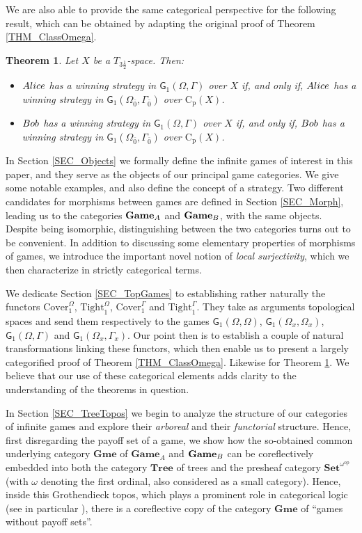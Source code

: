 \documentclass[12pt]{amsart}
\newtheorem{thm}{Theorem}[section]
\theoremstyle{definition}
\newcommand{\W}{{\Omega}}
\newcommand{\g}{\mathsf{G}}
\newcommand{\ali}{\textup{\textmd{\textsc{Alice}}}}
\newcommand{\bob}{\textup{\textmd{\textsc{Bob}}}}
\newcommand{\A}{\textup{\textmd{\textsc{A}}}}
\newcommand{\B}{\textup{\textmd{\textsc{B}}}}
\newcommand{\Cp}{\mathrm{C}_{\mathrm {p}}}
\newcommand{\Sets}{\mathbf{Set}}
\newcommand{\Tree}{\mathbf{Tree}}
\newcommand{\Games}{\mathbf{Game}}
\newcommand{\Gmes}{\mathbf{Gme}}
\newcommand{\SetNop}{\Sets^{\omega^{\op}}}
\newcommand{\op}{\mathrm{op}}
\newcommand{\Tight}{\mathrm{Tight}}
\newcommand{\Cover}{\mathrm{Cover}}
\begin{document}
We are also able to provide the same categorical perspective for the following result, which can be obtained by adapting the original proof of Theorem \ref{THM_ClassOmega}. 
\begin{thm}\label{THM_ClassGamma}	Let $X$ be a $T_{3\frac{1}{2}}$-space. Then:
	\begin{itemize}
		\item $\ali$ has a winning strategy in $\g_1(\W,\Gamma)$ over $X$ if, and only if,  $\ali$ has a winning strategy in $\g_1(\W_{\bar{0}},\Gamma_{\bar{0}})$ over $\Cp(X)$.
		\item $\bob$ has a winning strategy in $\g_1(\W,\Gamma)$ over $X$ if, and only if, $\bob$ has a winning strategy in $ \g_1(\W_{\bar{0}},\Gamma_{\bar{0}})$ over $\Cp(X)$.
	\end{itemize}
\end{thm}

In Section \ref{SEC_Objects} we formally define the infinite games of interest in this paper, and they serve as the objects of our principal game categories. We give some notable examples, and also define the concept of a strategy.
Two different candidates for morphisms between games are defined in Section \ref{SEC_Morph}, leading us to the categories $\Games_\A$ and $\Games_\B$, with the same objects. Despite being isomorphic, distinguishing between the two categories turns out to be convenient. In addition to discussing some elementary properties of morphisms of games, we introduce the important novel notion of \textit{local surjectivity}, which we then characterize in strictly categorical terms.

We dedicate Section \ref{SEC_TopGames} to establishing rather naturally the functors $\Cover^\W_1$, $\Tight^\W_1$, $\Cover^\Gamma_1$ and $\Tight^\Gamma_1$. They take as arguments topological spaces and send them respectively to the games  $\g_1(\W,\W)$, $\g_1(\W_x,\W_x)$, $\g_1(\W,\Gamma)$ and $\g_1(\W_x,\Gamma_x)$. Our point then is to establish a couple of natural transformations linking these functors, which then enable us to present a largely categorified proof of Theorem \ref{THM_ClassOmega}. Likewise for Theorem \ref{THM_ClassGamma}. We believe that our use of these categorical elements adds clarity to the understanding of the theorems in question.

In Section \ref{SEC_TreeTopos} we begin to analyze the structure of our categories of infinite games and explore their \textit{arboreal} and their \textit{functorial} structure. Hence, first disregarding the payoff set of a game, we show how the so-obtained common underlying category $\Gmes$ of  $\Games_A$ and $\Games_\B$ can be coreflectively embedded into both the category $\Tree$ of trees and the presheaf category $\SetNop$ (with $\omega$ denoting the first ordinal, also considered as a small category). Hence, inside this Grothendieck topos, which plays a prominent role in categorical logic (see in particular \cite{Birkedal2012}), there is a coreflective copy of the category $\Gmes$ of ``games without  payoff sets''.
\end{document}
